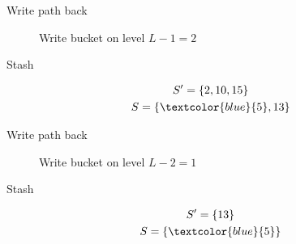 	\begin{frame}{Write path back}

		\selectedtrue%
		\pathreadtrue%

		\nodeonenewtrue%
		\nodetwonewtrue%

		\begin{figure}
			\centering

			
			\caption{Write bucket on level $L - 1 = 2$}
		\end{figure}

		\vspace{-12pt}

		\begin{block}{Stash}
			
			\begin{gather*}
				S^\prime = \{ 2, 10, 15 \} \\
				S = \{ \textcolor{blue}{5}, 13 \}
			\end{gather*}

		\end{block}
		
	\end{frame}

	\begin{frame}{Write path back}

		\selectedtrue%
		\pathreadtrue%

		\nodeonenewtrue%
		\nodetwonewtrue%
		\nodethreenewtrue%

		\begin{figure}
			\centering

			
			\caption{Write bucket on level $L - 2 = 1$}
		\end{figure}
		
		\vspace{-12pt}

		\begin{block}{Stash}
			
			\begin{gather*}
				S^\prime = \{ 13 \} \\
				S = \{ \textcolor{blue}{5} \}
			\end{gather*}

		\end{block}

	\end{frame}

